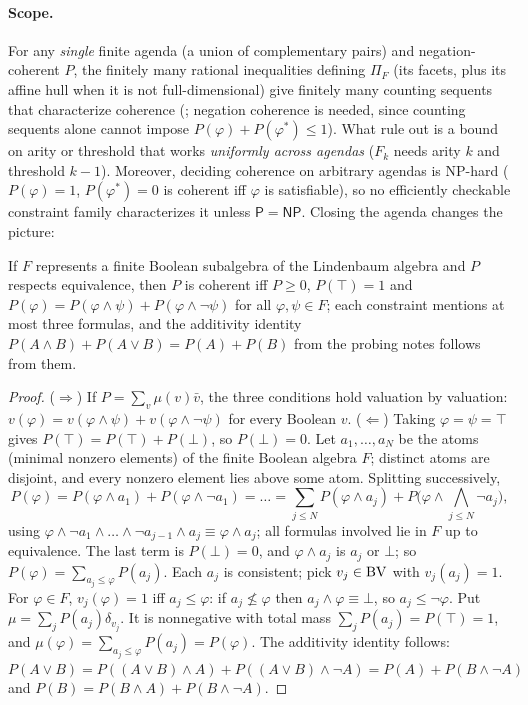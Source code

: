 \paragraph{Scope.} For any \emph{single} finite agenda (a union of complementary pairs) and negation-coherent $P$, the finitely many rational inequalities defining $\Pi_F$ (its facets, plus its affine hull when it is not full-dimensional) give finitely many counting sequents that characterize coherence (; negation coherence is needed, since counting sequents alone cannot impose $P(\varphi)+P(\varphi^*)\le1$). What  rule out is a bound on arity or threshold that works \emph{uniformly across agendas} ($F_k$ needs arity $k$ and threshold $k-1$). Moreover, deciding coherence on arbitrary agendas is NP-hard \citep{georgakopoulos1988probabilistic} ($P(\varphi)=1$, $P(\varphi^*)=0$ is coherent iff $\varphi$ is satisfiable), so no efficiently checkable constraint family characterizes it unless $\mathsf{P}=\mathsf{NP}$. Closing the agenda changes the picture:

\begin{proposition}\label{prop:existence:closed}
If $F$ represents a finite Boolean subalgebra of the Lindenbaum algebra and $P$ respects equivalence, then $P$ is coherent iff $P\ge0$, $P(\top)=1$ and $P(\varphi)=P(\varphi\wedge\psi)+P(\varphi\wedge\neg\psi)$ for all $\varphi,\psi\in F$; each constraint mentions at most three formulas, and the additivity identity $P(A\wedge B)+P(A\vee B)=P(A)+P(B)$ from the probing notes follows from them.
\end{proposition}

\begin{proof}
($\Rightarrow$) If $P=\sum_v\mu(v)\bar v$, the three conditions hold valuation by valuation: $v(\varphi)=v(\varphi\wedge\psi)+v(\varphi\wedge\neg\psi)$ for every Boolean $v$.
($\Leftarrow$) Taking $\varphi=\psi=\top$ gives $P(\top)=P(\top)+P(\bot)$, so $P(\bot)=0$. Let $a_1,\dots,a_N$ be the atoms (minimal nonzero elements) of the finite Boolean algebra $F$; distinct atoms are disjoint, and every nonzero element lies above some atom. Splitting successively,
\[
P(\varphi)=P(\varphi\wedge a_1)+P(\varphi\wedge\neg a_1)=\dots=\sum_{j\le N}P(\varphi\wedge a_j)+P\Big(\varphi\wedge\bigwedge_{j\le N}\neg a_j\Big),
\]
using $\varphi\wedge\neg a_1\wedge\dots\wedge\neg a_{j-1}\wedge a_j\equiv\varphi\wedge a_j$; all formulas involved lie in $F$ up to equivalence. The last term is $P(\bot)=0$, and $\varphi\wedge a_j$ is $a_j$ or $\bot$; so $P(\varphi)=\sum_{a_j\le\varphi}P(a_j)$. Each $a_j$ is consistent; pick $v_j\in\mathrm{BV}$ with $v_j(a_j)=1$. For $\varphi\in F$, $v_j(\varphi)=1$ iff $a_j\le\varphi$: if $a_j\not\le\varphi$ then $a_j\wedge\varphi\equiv\bot$, so $a_j\le\neg\varphi$. Put $\mu=\sum_jP(a_j)\delta_{v_j}$. It is nonnegative with total mass $\sum_jP(a_j)=P(\top)=1$, and $\mu(\varphi)=\sum_{a_j\le\varphi}P(a_j)=P(\varphi)$.
The additivity identity follows: $P(A\vee B)=P((A\vee B)\wedge A)+P((A\vee B)\wedge\neg A)=P(A)+P(B\wedge\neg A)$ and $P(B)=P(B\wedge A)+P(B\wedge\neg A)$.
\end{proof}

